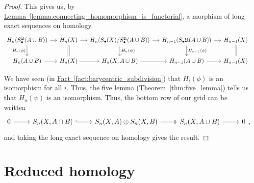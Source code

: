 \documentclass[main.tex]{subfiles}
\begin{document}
\begin{proof}
  This gives us, by \hyperref[lemma:connecting_homomorphism_is_functorial]{Lemma~\ref*{lemma:connecting_homomorphism_is_functorial}}, a morphism of long exact sequences on homology.
  \begin{equation*}
    \begin{tikzcd}[column sep=small]
      H_{n}(S_{\bullet}^{\mathfrak{U}}(A \cup B))
      \arrow[r]
      \arrow[d, swap, "H_{n}(\phi)"]
      & H_{n}(X)
      \arrow[r]
      \arrow[d, equals]
      & H_{n}(S_{\bullet}(X)/S_{\bullet}^{\mathfrak{U}}(A \cup B))
      \arrow[r]
      \arrow[d, "H_{n}(\psi)"]
      & H_{n-1}(S_{\bullet}\mathfrak{U}(A \cup B))
      \arrow[r]
      \arrow[d, "H_{n-1}(\phi)"]
      & H_{n-1}(X)
      \arrow[d, equals]
      \\
      H_{n}(A \cup B)
      \arrow[r]
      & H_{n}(X)
      \arrow[r]
      & H_{n}(X, A \cup B)
      \arrow[r]
      & H_{n-1}(A \cup B)
      \arrow[r]
      & H_{n-1}(X)
    \end{tikzcd}
  \end{equation*}

  We have seen (in \hyperref[fact:barycentric_subdivision]{Fact~\ref*{fact:barycentric_subdivision}}) that $H_{i}(\phi)$ is an isomorphism for all $i$. Thus, the five lemma (\hyperref[thm:five_lemma]{Theorem~\ref*{thm:five_lemma}}) tells us that $H_{n}(\psi)$ is an isomorphism. Thus, the bottom row of our grid can be written
  \begin{equation*}
    \begin{tikzcd}
      0
      \arrow[r]
      & S_{n}(X, A \cap B)
      \arrow[r, hook]
      & S_{n}(X, A) \oplus S_{n}(X, B)
      \arrow[r, two heads]
      & S_{n}(X, A \cup B)
      \arrow[r]
      & 0
    \end{tikzcd},
  \end{equation*}
  and taking the long exact sequence on homology gives the result.
\end{proof}

\section{Reduced homology}
\label{sec:reduced_homology}
\end{document}
